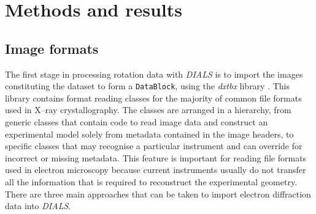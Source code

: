 \documentclass[preprint]{iucr}
\newcommand{\dxtbx}{\emph{dxtbx}\xspace}
\newcommand{\dials}{\emph{DIALS}\xspace}
\newcommand{\code}{\texttt}
\begin{document}
\section{Methods and results}
\subsection{Image formats}

The first stage in processing rotation data with \dials is to import the images
constituting the dataset to form a \code{DataBlock}, using the \dxtbx library
\cite{Parkhurst2014}. This library contains format reading classes for the
majority of common file formats used in X--ray crystallography. The classes are
arranged in a hierarchy, from generic classes that contain code to read image
data and construct an experimental model solely from metadata contained in the
image headers, to specific classes that may recognise a particular instrument
and can override for incorrect or missing metadata. This feature is important
for reading file formats used in electron microscopy because current
instruments usually do not transfer all the information that is required to
reconstruct the experimental geometry. There are three main approaches that can
be taken to import electron diffraction data into \dials.
\end{document}
